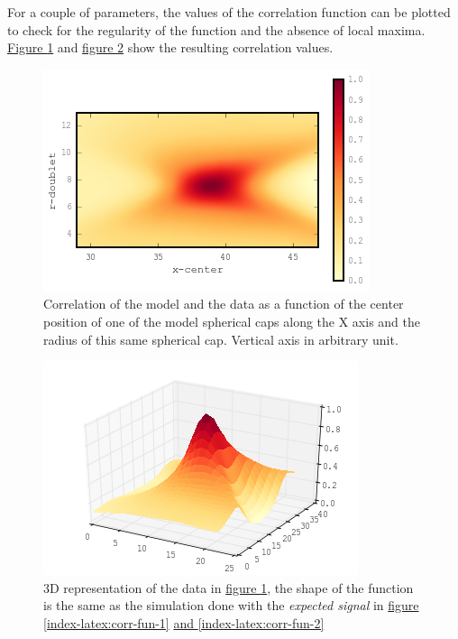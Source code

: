 \documentclass[A4paperpaper,11pt,english]{sphinxmanual}
\begin{document}
For a couple of parameters, the values of the correlation function can be plotted
to check for the regularity of the function and the absence of local maxima. \hyperref[index-latex:gof2d]{Figure  \ref*{index-latex:gof2d}} and \hyperref[index-latex:gof3d]{figure  \ref*{index-latex:gof3d}} show the resulting correlation values.
\begin{figure}[htbp]
\centering
\capstart

\includegraphics[width=0.600\linewidth]{gof-2d-doublets.png}
\caption{Correlation of the model and the data as a function of the center position
of one of the model spherical caps along the X axis and the radius of this
same spherical cap. Vertical axis in arbitrary unit.}\label{index-latex:gof2d}\end{figure}
\begin{figure}[htbp]
\centering
\capstart

\includegraphics[width=0.600\linewidth]{gof-3d-doublets.png}
\caption{3D representation of the data in \hyperref[index-latex:gof2d]{figure  \ref*{index-latex:gof2d}}, the shape of the
function is the same as the simulation done with the \emph{expected signal} in
\hyperref[index-latex:corr-fun-1]{figure  \ref*{index-latex:corr-fun-1}} \hyperref[index-latex:corr-fun-2]{and  \ref*{index-latex:corr-fun-2}}}\label{index-latex:gof3d}\end{figure}
\end{document}
